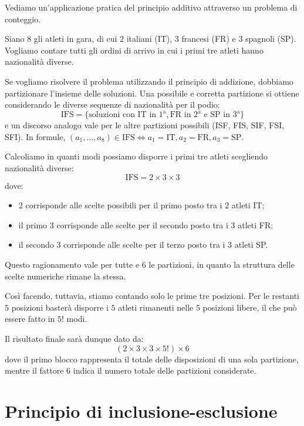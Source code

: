 \documentclass[12pt]{report}
\begin{document}
	Vediamo un'applicazione pratica del principio additivo attraverso un problema di conteggio.
	
	Siano $8$ gli atleti in gara, di cui $2$ italiani (IT), $3$ francesi (FR) e $3$ spagnoli (SP). Vogliamo contare tutti gli ordini di arrivo in cui i primi tre atleti hanno nazionalità diverse.
	
	Se vogliamo risolvere il problema utilizzando il principio di addizione, dobbiamo partizionare l'insieme delle soluzioni. Una possibile e corretta partizione si ottiene considerando le diverse sequenze di nazionalità per il podio:
	\[
		\text{IFS} = \{\text{soluzioni con IT in } 1^{\text{a}}, \text{FR in } 2^{\text{a}} \text{ e SP in } 3^{\text{a}}\}
	\]
	e un discorso analogo vale per le altre partizioni possibili (ISF, FIS, SIF, FSI, SFI). In formule, $(a_1, \dots, a_8) \in \text{IFS} \iff a_1 = \text{IT}, a_2 = \text{FR}, a_3 = \text{SP}$.
	
	Calcoliamo in quanti modi possiamo disporre i primi tre atleti scegliendo nazionalità diverse:
	\[
		\text{IFS} = 2 \times 3 \times 3
	\]
	dove:
	\begin{itemize}
		
		\item $2$ corrisponde alle scelte possibili per il primo posto tra i $2$ atleti IT;
		
		\item il primo $3$ corrisponde alle scelte per il secondo posto tra i $3$ atleti FR;
		
		\item il secondo $3$ corrisponde alle scelte per il terzo posto tra i $3$ atleti SP.
		
	\end{itemize}
	
	Questo ragionamento vale per tutte e $6$ le partizioni, in quanto la struttura delle scelte numeriche rimane la stessa. 
	
	Così facendo, tuttavia, stiamo contando solo le prime tre posizioni. Per le restanti $5$ posizioni basterà disporre i $5$ atleti rimanenti nelle $5$ posizioni libere, il che può essere fatto in $5!$ modi.
	
	Il risultato finale sarà dunque dato da:
	\[
		(2 \times 3 \times 3 \times 5!) \times 6
	\]
	dove il primo blocco rappresenta il totale delle disposizioni di una sola partizione, mentre il fattore $6$ indica il numero totale delle partizioni considerate.
	
	\section{Principio di inclusione-esclusione}
	
\end{document}
